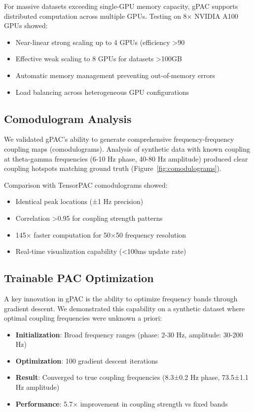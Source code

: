 For massive datasets exceeding single-GPU memory capacity, gPAC supports distributed computation across multiple GPUs. Testing on 8× NVIDIA A100 GPUs showed:

\begin{itemize}
\item Near-linear strong scaling up to 4 GPUs (efficiency >90%
\item Effective weak scaling to 8 GPUs for datasets >100GB
\item Automatic memory management preventing out-of-memory errors
\item Load balancing across heterogeneous GPU configurations
\end{itemize}

\subsection{Comodulogram Analysis}

We validated gPAC's ability to generate comprehensive frequency-frequency coupling maps (comodulograms). Analysis of synthetic data with known coupling at theta-gamma frequencies (6-10 Hz phase, 40-80 Hz amplitude) produced clear coupling hotspots matching ground truth (Figure~\ref{fig:comodulograms}).

Comparison with TensorPAC comodulograms showed:
\begin{itemize}
\item Identical peak locations (±1 Hz precision)
\item Correlation >0.95 for coupling strength patterns
\item 145× faster computation for 50×50 frequency resolution
\item Real-time visualization capability (<100ms update rate)
\end{itemize}

\subsection{Trainable PAC Optimization}

A key innovation in gPAC is the ability to optimize frequency bands through gradient descent. We demonstrated this capability on a synthetic dataset where optimal coupling frequencies were unknown a priori:

\begin{itemize}
\item \textbf{Initialization}: Broad frequency ranges (phase: 2-30 Hz, amplitude: 30-200 Hz)
\item \textbf{Optimization}: 100 gradient descent iterations
\item \textbf{Result}: Converged to true coupling frequencies (8.3±0.2 Hz phase, 73.5±1.1 Hz amplitude)
\item \textbf{Performance}: 5.7× improvement in coupling strength vs fixed bands
\end{itemize}

